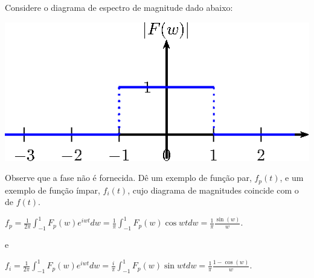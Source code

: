 \begin{exer}Considere o diagrama de espectro de magnitude dado abaixo:
    \begin{center}
    \includegraphics{cap_diagramas_espectro_transformada/pics/figura_6}
    \end{center}        
    Observe que a fase não é fornecida. Dê um exemplo de função par, $f_p(t)$, e um exemplo de função ímpar, $f_i(t)$, cujo diagrama de magnitudes coincide com o de $f(t)$. 


\end{exer}

\begin{resp}
    $f_p = \frac{1}{2\pi}\int_{-1}^1F_p(w)e^{iwt}dw=\frac{1}{\pi}\int_{-1}^1F_p(w)\cos{wt}dw=\frac{1}{\pi}\frac{\sin(w)}{w}.$
    
    e 
    
    $f_i = \frac{1}{2\pi}\int_{-1}^1F_p(w)e^{iwt}dw=\frac{i}{\pi}\int_{-1}^1F_p(w)\sin{wt}dw=\frac{1}{\pi}\frac{1-\cos(w)}{w}.$
\end{resp}